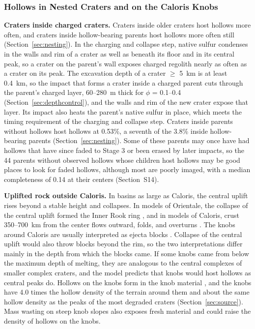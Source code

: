 \documentclass[article,review]{planetary}
\begin{document}
\FloatBarrier

\subsubsection{Hollows in Nested Craters and on the Caloris Knobs}

\textbf{Craters inside charged craters.} Craters inside older craters host hollows more often, and craters inside hollow-bearing parents host hollows more often still (Section~\ref{sec:nesting}). In the charging and collapse step, native sulfur condenses in the walls and rim of a crater as well as beneath its floor and in its central peak, so a crater on the parent's wall exposes charged regolith nearly as often as a crater on its peak. The excavation depth of a crater $\geq$ 5~km is at least 0.4~km, so the impact that forms a crater inside a charged parent cuts through the parent's charged layer, 60--280~m thick for $\phi$ = 0.1--0.4 (Section~\ref{sec:depthcontrol}), and the walls and rim of the new crater expose that layer. Its impact also heats the parent's native sulfur in place, which meets the timing requirement of the charging and collapse step. Craters inside parents without hollows host hollows at 0.53\%, a seventh of the 3.8\% inside hollow-bearing parents (Section~\ref{sec:nesting}). Some of these parents may once have had hollows that have since faded to Stage 3 or been erased by later impacts, so the 44 parents without observed hollows whose children host hollows may be good places to look for faded hollows, although most are poorly imaged, with a median completeness of 0.14 at their centers (Section~S14).

\textbf{Uplifted rock outside Caloris.} In basins as large as Caloris, the central uplift rises beyond a stable height and collapses. In models of Orientale, the collapse of the central uplift formed the Inner Rook ring \parencite{johnsonFormationOrientaleLunar2016}, and in models of Caloris, crust 350--700~km from the center flows outward, folds, and overturns \parencite{gosselinCrustalBlockMuted2023}. The knobs around Caloris are usually interpreted as ejecta blocks \parencite{fassett2009,ackissKnobHeightsCircumCaloris2015}. Collapse of the central uplift would also throw blocks beyond the rim, so the two interpretations differ mainly in the depth from which the blocks came. If some knobs came from below the maximum depth of melting, they are analogous to the central complexes of smaller complex craters, and the model predicts that knobs would host hollows as central peaks do. Hollows on the knobs form in the knob material \parencite{wright2020}, and the knobs have 4.0 times the hollow density of the terrain around them and about the same hollow density as the peaks of the most degraded craters (Section~\ref{sec:source}). Mass wasting on steep knob slopes also exposes fresh material \parencite{wright2020} and could raise the density of hollows on the knobs.
\end{document}

